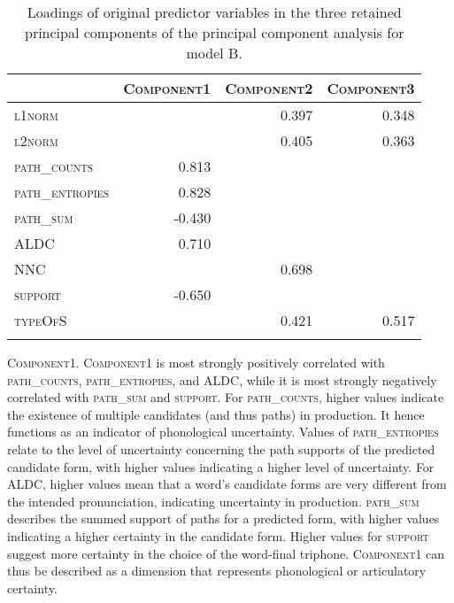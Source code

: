 \begin{table}\fontsize{10}{11}
\caption{Loadings of original predictor variables in the three retained principal components of the principal component analysis for model B.}
\label{tab:5.5}
\centering
\begin{tabular}{lrrr} 
\lsptoprule
~               & \textsc{Component1} & \textsc{Component2} & \textsc{Component3}  \\ 
\midrule
\textsc{l1norm}          & ~          & 0.397      & 0.348       \\
\textsc{l2norm}          & ~          & 0.405      & 0.363       \\
\textsc{path\_counts}    & 0.813      & ~          & ~           \\
\textsc{path\_entropies} & 0.828      & ~          & ~           \\
\textsc{path\_sum}       & -0.430     & ~          & ~           \\
\textsc{ALDC}            & 0.710      & ~          & ~           \\
\textsc{NNC}             & ~          & 0.698      & ~           \\
\textsc{support}         & -0.650     & ~          & ~           \\
\textsc{typeOfS}           & ~          & 0.421      & 0.517       \\
\lspbottomrule
\end{tabular}
\end{table}

\textsc{Component1}. \textsc{Component1} is most strongly positively correlated with \textsc{path\_counts}, \textsc{path\_entropies}, and \textsc{ALDC}, while it is most strongly negatively correlated with \textsc{path\_sum} and \textsc{support}. For \textsc{path\_counts}, higher values indicate the existence of multiple candidates (and thus paths) in production. It hence functions as an indicator of phonological uncertainty. Values of \textsc{path\_entropies} relate to the level of uncertainty concerning the path supports of the predicted candidate form, with higher values indicating a higher level of uncertainty. For \textsc{ALDC}, higher values mean that a word’s candidate forms are very different from the intended pronunciation, indicating uncertainty in production. \textsc{path\_sum} describes the summed support of paths for a predicted form, with higher values indicating a higher certainty in the candidate form. Higher values for \textsc{support} suggest more certainty in the choice of the word-final triphone. \textsc{Component1} can thus be described as a dimension that represents phonological or articulatory certainty.

